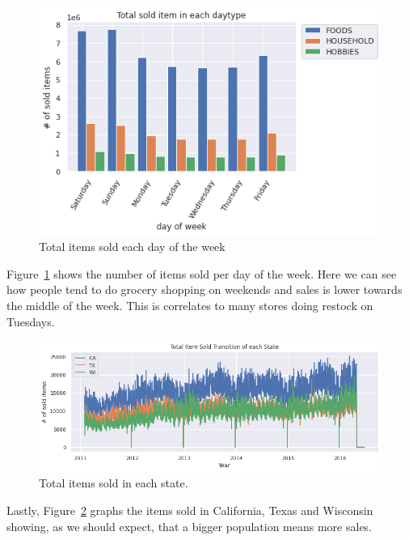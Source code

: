 \documentclass[10pt,twocolumn,letterpaper]{article}
\begin{document}
\begin{figure}
  \begin{center}
    \includegraphics[width=0.8\linewidth]{img/totalSoldItemInEachDayOfWeek.png}
  \end{center}
    \caption{Total items sold each day of the week}
  \label{fig:totalSoldItemInEachDayOfWeek}
\end{figure}
  Figure~\ref{fig:totalSoldItemInEachDayOfWeek} shows the number of items sold
  per day of the week. Here we can see how people tend to do grocery shopping on
  weekends and sales is lower towards the middle of the week. This is correlates
  to many stores doing restock on Tuesdays.

\begin{figure}
  \begin{center}
    \includegraphics[width=0.8\linewidth]{img/totalItemSoldInEachState.png}
  \end{center}
    \caption{Total items sold in each state.}
  \label{fig:totalItemSoldInEachState}
\end{figure}
  Lastly, Figure~\ref{fig:totalItemSoldInEachState} graphs the items sold in
  California, Texas and Wisconsin showing, as we should expect, that a bigger
  population means more sales.

\end{document}
